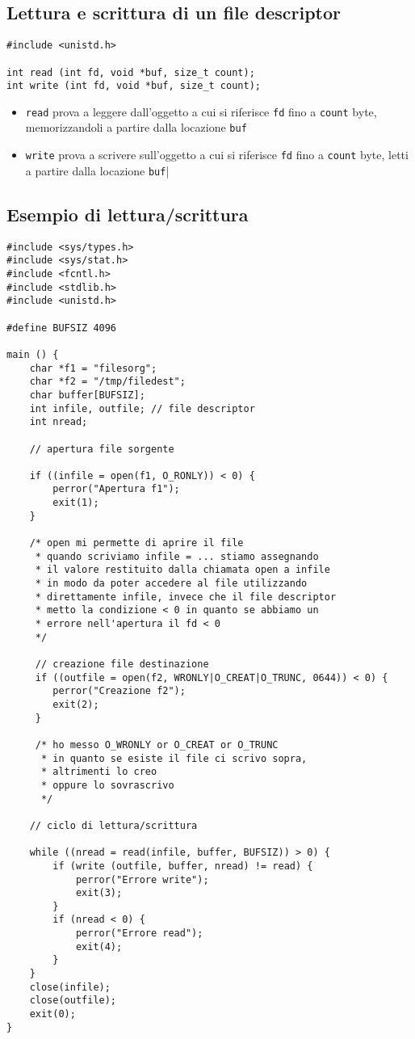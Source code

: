\documentclass[italian,12pt,a4paper]{article}
\begin{document}
\subsection{Lettura e scrittura di un file descriptor}
\begin{lstlisting}
#include <unistd.h>

int read (int fd, void *buf, size_t count);
int write (int fd, void *buf, size_t count);
\end{lstlisting}
\begin{itemize}
	\item \verb|read| prova a leggere dall'oggetto a cui si riferisce \verb|fd| fino a \verb|count| byte, memorizzandoli a partire dalla locazione \verb|buf|
	\item \verb|write| prova a scrivere sull'oggetto a cui si riferisce \verb|fd| fino a \verb|count| byte, letti a partire dalla locazione \verb|buf||
\end{itemize}
\subsection{Esempio di lettura/scrittura}
\begin{lstlisting}[xleftmargin=-1.5cm]
#include <sys/types.h>
#include <sys/stat.h>
#include <fcntl.h>
#include <stdlib.h>
#include <unistd.h>

#define BUFSIZ 4096

main () {
	char *f1 = "filesorg";
	char *f2 = "/tmp/filedest";
	char buffer[BUFSIZ];
	int infile, outfile; // file descriptor
	int nread;
	
	// apertura file sorgente
	
	if ((infile = open(f1, O_RONLY)) < 0) {
		perror("Apertura f1");
		exit(1);
	}
	
	/* open mi permette di aprire il file
	 * quando scriviamo infile = ... stiamo assegnando
	 * il valore restituito dalla chiamata open a infile
	 * in modo da poter accedere al file utilizzando
	 * direttamente infile, invece che il file descriptor
	 * metto la condizione < 0 in quanto se abbiamo un 
	 * errore nell'apertura il fd < 0
	 */
	 
	 // creazione file destinazione
	 if ((outfile = open(f2, WRONLY|O_CREAT|O_TRUNC, 0644)) < 0) {
	 	perror("Creazione f2");
	 	exit(2);
	 }
	 
	 /* ho messo O_WRONLY or O_CREAT or O_TRUNC
	  * in quanto se esiste il file ci scrivo sopra, 
	  * altrimenti lo creo
	  * oppure lo sovrascrivo
	  */
	
	// ciclo di lettura/scrittura 
	
	while ((nread = read(infile, buffer, BUFSIZ)) > 0) {
		if (write (outfile, buffer, nread) != read) {
			perror("Errore write");
			exit(3);
		}
		if (nread < 0) {
			perror("Errore read");
			exit(4);
		}
	}
	close(infile);
	close(outfile);
	exit(0);
}
\end{lstlisting}
\end{document}
